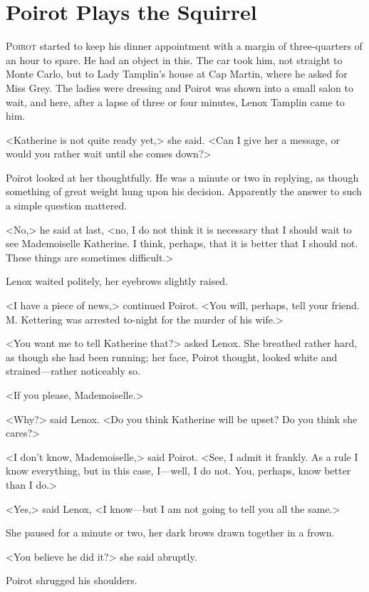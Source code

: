 \chapter{Poirot Plays the Squirrel}



\lettrine{P}{oirot} started to keep his dinner appointment with a margin of three-quarters of an hour to spare. He had an object in this. The car took him, not straight to Monte Carlo, but to Lady Tamplin's house at Cap Martin, where he asked for Miss Grey. The ladies were dressing and Poirot was shown into a small salon to wait, and here, after a lapse of three or four minutes, Lenox Tamplin came to him.

<Katherine is not quite ready yet,> she said. <Can I give her a message, or would you rather wait until she comes down?>

Poirot looked at her thoughtfully. He was a minute or two in replying, as though something of great weight hung upon his decision. Apparently the answer to such a simple question mattered.

<No,> he said at last, <no, I do not think it is necessary that I should wait to see Mademoiselle Katherine. I think, perhaps, that it is better that I should not. These things are sometimes difficult.>

Lenox waited politely, her eyebrows slightly raised.

<I have a piece of news,> continued Poirot. <You will, perhaps, tell your friend. M. Kettering was arrested to-night for the murder of his wife.>

<You want me to tell Katherine that?> asked Lenox. She breathed rather hard, as though she had been running; her face, Poirot thought, looked white and strained—rather noticeably so.

<If you please, Mademoiselle.>

<Why?> said Lenox. <Do you think Katherine will be upset? Do you think she cares?>

<I don't know, Mademoiselle,> said Poirot. <See, I admit it frankly. As a rule I know everything, but in this case, I—well, I do not. You, perhaps, know better than I do.>

<Yes,> said Lenox, <I know—but I am not going to tell you all the same.>

She paused for a minute or two, her dark brows drawn together in a frown.

<You believe he did it?> she said abruptly.

Poirot shrugged his shoulders.

